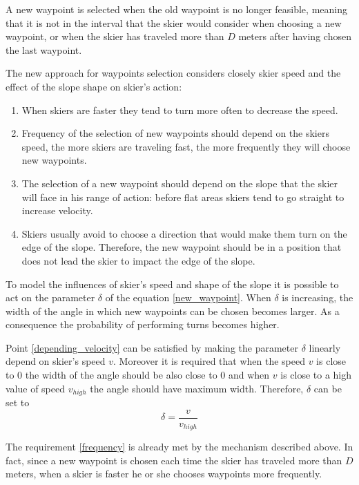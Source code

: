 \documentclass[12pt,a4paper,twoside]{book}
\begin{document}
A new waypoint is selected when the old waypoint is no longer feasible, meaning that it is not in the interval that the skier would consider when choosing a new waypoint, or when the skier has traveled more than $D$ meters after having chosen the last waypoint.

The new approach for waypoints selection considers closely skier speed and the effect of the slope shape on skier's action:\begin{enumerate}
\item \label{depending_velocity} When skiers are faster they tend to turn more often to decrease the speed.
\item \label{frequency} Frequency of the selection of new waypoints should depend on the skiers speed, the more skiers are traveling fast, the more frequently they will choose new waypoints.
\item \label{depending_slope} The selection of a new waypoint should depend on the slope that the skier will face in his range of action: before flat areas skiers tend to go straight to increase velocity.
\item \label{avoid_impact} Skiers usually avoid to choose a direction that would make them turn on the edge of the slope. Therefore, the new waypoint should be in a position that does not lead the skier to impact the edge of the slope.
\end{enumerate}

To model the influences of skier's speed and shape of the slope it is possible to act on the parameter $\delta$ of the equation \ref{new_waypoint}. When $\delta$ is increasing, the width of the angle in which new waypoints can be chosen becomes larger. As a consequence the probability of performing turns becomes higher.

Point \ref{depending_velocity} can be satisfied by making the parameter $\delta$ linearly depend on skier's speed $v$. Moreover it is required that when the speed $v$ is close to $0$ the width of the angle should be also close to $0$ and when $v$ is close to a high value of speed $v_{high}$ the angle should have maximum width. Therefore, $\delta$ can be set to
\begin{equation}\label{delta_vel}
\delta= \frac{v}{v_{high}}
\end{equation}

The requirement \ref{frequency} is already met by the mechanism described above. In fact, since a new waypoint is chosen each time the skier has traveled more than $D$ meters, when a skier is faster he or she chooses waypoints more frequently.
\end{document}
